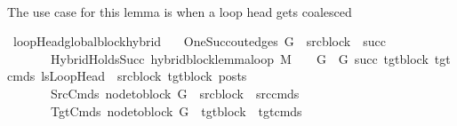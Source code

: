 \begin{isabellebody}
\isanewline
\ \ \ \ \isamarkupfalse%
\isanewline
\ \ \isamarkupfalse%
\isanewline
{}\isamarkupfalse%
%
\endisatagproof
{\isafoldproof}%
%
\isadelimproof
%
\endisadelimproof
%
\isadelimdocument
%
\endisadelimdocument
%
\isatagdocument
%
\isamarkuptrue%
%
\endisatagdocument
{\isafolddocument}%
%
\isadelimdocument
%
\endisadelimdocument
%
\begin{isamarkuptext}%
The use case for this lemma is when a loop head gets coalesced%
\end{isamarkuptext}\isamarkuptrue%
\isamarkupfalse%
\ loopHead{\isacharunderscore}{\kern0pt}global{\isacharunderscore}{\kern0pt}block{\isacharunderscore}{\kern0pt}hybrid{\isacharcolon}{\kern0pt}\isanewline
\ \ \ OneSucc{\isacharcolon}{\kern0pt}{\isachardoublequoteopen}out{\isacharunderscore}{\kern0pt}edges\ G\ {\isacharbang}{\kern0pt}\ src{\isacharunderscore}{\kern0pt}block\ {\isacharequal}{\kern0pt}\ {\isacharbrackleft}{\kern0pt}succ{\isacharbrackright}{\kern0pt}{\isachardoublequoteclose}\isanewline
\ \ \ \ \ \ \ HybridHoldsSucc{\isacharcolon}{\kern0pt}\ {\isachardoublequoteopen}hybrid{\isacharunderscore}{\kern0pt}block{\isacharunderscore}{\kern0pt}lemma{\isacharunderscore}{\kern0pt}loop\ M\ {\isasymLambda}\ {\isasymGamma}\ {\isasymOmega}\ G\ \ G{\isacharprime}{\kern0pt}\ succ\ tgt{\isacharunderscore}{\kern0pt}block\ tgt{\isacharunderscore}{\kern0pt}cmds{\isacharunderscore}{\kern0pt}{}\ {\isacharparenleft}{\kern0pt}lsLoopHead\ {\isasymunion}\ {\isacharbraceleft}{\kern0pt}{\isacharparenleft}{\kern0pt}src{\isacharunderscore}{\kern0pt}block{\isacharcomma}{\kern0pt}\ tgt{\isacharunderscore}{\kern0pt}block{\isacharparenright}{\kern0pt}{\isacharbraceright}{\kern0pt}{\isacharparenright}{\kern0pt}\ posts{\isachardoublequoteclose}\ \isanewline
\ \ \ \ \ \ \ SrcCmds{\isacharcolon}{\kern0pt}\ {\isachardoublequoteopen}node{\isacharunderscore}{\kern0pt}to{\isacharunderscore}{\kern0pt}block\ G\ {\isacharbang}{\kern0pt}\ src{\isacharunderscore}{\kern0pt}block\ {\isacharequal}{\kern0pt}\ src{\isacharunderscore}{\kern0pt}cmds{\isachardoublequoteclose}\isanewline
\ \ \ \ \ \ \ TgtCmds{\isacharcolon}{\kern0pt}\ {\isachardoublequoteopen}node{\isacharunderscore}{\kern0pt}to{\isacharunderscore}{\kern0pt}block\ G{\isacharprime}{\kern0pt}\ {\isacharbang}{\kern0pt}\ tgt{\isacharunderscore}{\kern0pt}block\ {\isacharequal}{\kern0pt}\ tgt{\isacharunderscore}{\kern0pt}cmds{\isachardoublequoteclose}\isanewline

\end{isabellebody}
